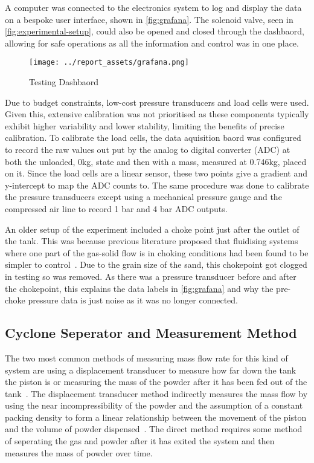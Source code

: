 A computer was connected to the electronics system to log and display the data on a bespoke user interface, shown in \autoref{fig:grafana}. The solenoid valve, seen in \autoref{fig:experimental-setup}, could also be opened and closed through the dashbaord, allowing for safe operations as all the information and control was in one place.
\begin{figure}[htbp]
    \centering

    \begin{minipage}{0.95\textwidth}
        \centering
        \texttt{[image: ../report\_assets/grafana.png]}
        \caption{Testing Dashbaord}\label{fig:grafana}
    \end{minipage}

\end{figure}
Due to budget constraints, low-cost pressure transducers and load cells were used. Given this, extensive calibration was not prioritised as these components typically exhibit higher variability and lower stability, limiting the benefits of precise calibration. To calibrate the load cells, the data aquisition baord was configured to record the raw values out put by the analog to digital converter (ADC) at both the unloaded, 0kg, state and then with a mass, measured at 0.746kg, placed on it. Since the load cells are a linear sensor, these two points give a gradient and y-intercept to map the ADC counts to. The same procedure was done to calibrate the pressure transducers except using a mechanical pressure gauge and the compressed air line to record 1 bar and 4 bar ADC outputs.

An older setup of the experiment included a choke point just after the outlet of the tank. This was because previous literature proposed that fluidising systems where one part of the gas-solid flow is in choking conditions had been found to be simpler to control~\cite{SUN201630}. Due to the grain size of the sand, this chokepoint got clogged in testing so was removed. As there was a pressure transducer before and after the chokepoint, this explains the data labels in \autoref{fig:grafana} and why the pre-choke pressure data is just noise as it was no longer connected.

\subsection{Cyclone Seperator and Measurement Method}
The two most common methods of measuring mass flow rate for this kind of system are using a displacement transducer to measure how far down the tank the piston is or measuring the mass of the powder after it has been fed out of the tank~\cite{SUN201630}\cite{LI2021712}\cite{Tang22}. The displacement transducer method indirectly measures the mass flow by using the near incompressibility of the powder and the assumption of a constant packing density to form a linear relationship between the movement of the piston and the volume of powder dispensed~\cite{SUN201630}. The direct method requires some method of seperating the gas and powder after it has exited the system and then measures the mass of powder over time. 

